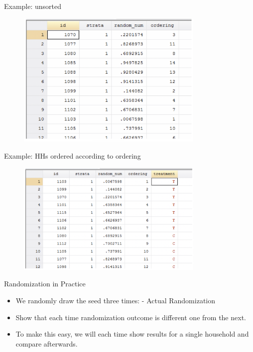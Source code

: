 \documentclass[aspectratio=169]{beamer}
\begin{document}
\begin{frame}{Example: unsorted}

\begin{figure}
	\centering
	\includegraphics[width= 90mm]{img/Unsorted}
\end{figure}

\end{frame}


\begin{frame}{Example: HHs ordered according to ordering}

\begin{figure}
	\centering
	\includegraphics[width= 90mm]{img/Unsorted2}
\end{figure}

\end{frame}


\begin{frame}{Randomization in Practice}

\begin{itemize}[<default overlay specification>]
	\item<1>  We randomly draw the seed three times:
		\newline  - Actual Randomization
	\item<1>  Show that each time randomization outcome is different one from the next. 
	\item<1>  To make this easy, we will each time show results for a single household and compare afterwards.
\end{itemize}

\end{frame}
\end{document}
